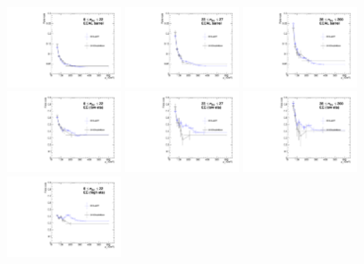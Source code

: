 \begin{figure}[!htbp]
\centering
\includegraphics[width=0.3\textwidth]{fig/compare_pv_EB_2016_0to22.pdf}
\includegraphics[width=0.3\textwidth]{fig/compare_pv_EB_2016_23to27.pdf}
\includegraphics[width=0.3\textwidth]{fig/compare_pv_EB_2016_28to200.pdf}\\
\includegraphics[width=0.3\textwidth]{fig/compare_pv_EE1_2016_0to22.pdf}
\includegraphics[width=0.3\textwidth]{fig/compare_pv_EE1_2016_23to27.pdf}
\includegraphics[width=0.3\textwidth]{fig/compare_pv_EE1_2016_28to200.pdf}\\
\includegraphics[width=0.3\textwidth]{fig/compare_pv_EE2_2016_0to22.pdf}

\end{figure}

